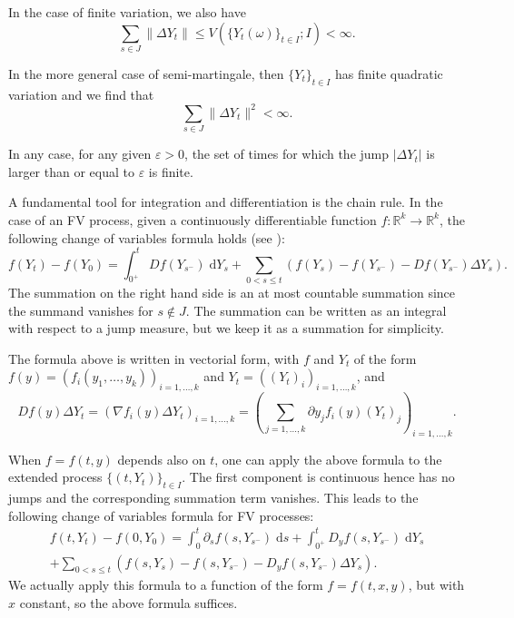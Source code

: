 \documentclass[reqno,12pt]{amsart}
\theoremstyle{plain} %
\theoremstyle{definition} %
\begin{document}
In the case of finite variation, we also have
\begin{equation}
    \label{estimatejumpfv}
    \sum_{s\in J} \|\Delta Y_t\| \leq V(\{Y_t(\omega)\}_{t\in I}; I) < \infty.
\end{equation}

In the more general case of semi-martingale, then $\{Y_t\}_{t\in I}$ has finite quadratic variation \cite[Section II.6]{Protter2005} and we find that
\[
    \sum_{s\in J} \|\Delta Y_t\|^2 < \infty.
\]

In any case, for any given $\varepsilon > 0$, the set of times for which the jump $|\Delta Y_t|$ is larger than or equal to $\varepsilon$ is finite.

A fundamental tool for integration and differentiation is the chain rule. In the case of an FV process, given a continuously differentiable function $f:\mathbb{R}^k \rightarrow \mathbb{R}^k$, the following change of variables formula holds (see \cite[Theorems II.31 and II.33]{Protter2005}):
\begin{equation}
    f(Y_t) - f(Y_0) = \int_{0^+}^t Df(Y_{s^-}) \;\mathrm{d}Y_s + \sum_{0 < s \leq t} \left( f(Y_s) - f(Y_{s^{-}}) - Df(Y_{s^-})\Delta Y_s\right).
\end{equation}
The summation on the right hand side is an at most countable summation since the summand vanishes for $s \notin J$. The summation can be written as an integral with respect to a jump measure, but we keep it as a summation for simplicity.

The formula above is written in vectorial form, with $f$ and $Y_t$ of the form $f(y)=(f_i(y_1, \ldots, y_k))_{i=1, \ldots, k}$ and $Y_t = ((Y_t)_i)_{i=1, \ldots, k}$, and
\[
    Df(y)\Delta Y_t = \left( \nabla f_i(y)\Delta Y_t\right)_{i=1, \ldots, k} = \left( \sum_{j=1, \ldots, k} \partial y_j f_i(y) (Y_t)_j \right)_{i=1, \ldots, k}.
\]

When $f=f(t, y)$ depends also on $t$, one can apply the above formula to the extended process $\{(t, Y_t)\}_{t\in I}$. The first component is continuous hence has no jumps and the corresponding summation term vanishes. This leads to the following change of variables formula for FV processes:
\begin{multline}
    \label{changeofvariablesformulacadlagfv}
    f(t, Y_t) - f(0, Y_0) = \int_0^t \partial_s f(s, Y_{s^-})\;\mathrm{d}s + \int_{0^+}^t D_y f(s, Y_{s^-}) \;\mathrm{d}Y_s \\
    + \sum_{0 < s \leq t} \left( f(s, Y_s) - f(s, Y_{s^{-}}) - D_y f(s, Y_{s^-})\Delta Y_s\right).
\end{multline}
We actually apply this formula to a function of the form $f=f(t, x, y)$, but with $x$ constant, so the above formula suffices.
\end{document}
